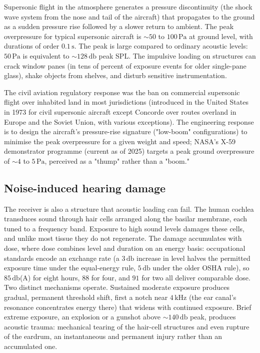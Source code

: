 Supersonic flight in the atmosphere generates a pressure
discontinuity (the shock wave system from the nose and tail of the
aircraft) that propagates to the ground as a sudden pressure rise
followed by a slower return to ambient. The peak overpressure for
typical supersonic aircraft is $\sim 50$ to $100\,\si{\pascal}$ at
ground level, with durations of order $0.1\,\si{\second}$. The peak
is large compared to ordinary acoustic levels: $50\,\si{\pascal}$ is
equivalent to $\sim 128\,\si{\decibel}$ peak SPL. The impulsive
loading on structures can crack window panes (in tens of percent of
exposure events for older single-pane glass), shake objects from
shelves, and disturb sensitive instrumentation.

The civil aviation regulatory response was the ban on commercial
supersonic flight over inhabited land in most jurisdictions
(introduced in the United States in 1973 for civil supersonic
aircraft except Concorde over routes overland in Europe and the
Soviet Union, with various exceptions). The engineering response is
to design the aircraft's pressure-rise signature ("low-boom"
configurations) to minimise the peak overpressure for a given
weight and speed; NASA's X-59 demonstrator programme (current as of
2025) targets a peak ground overpressure of $\sim 4$ to $5\,\si{
\pascal}$, perceived as a "thump" rather than a "boom."

\subsection{Noise-induced hearing damage}

The receiver is also a structure that acoustic loading can fail. The
human cochlea transduces sound through hair cells arranged along the
basilar membrane, each tuned to a frequency band. Exposure to high
sound levels damages these cells, and unlike most tissue they do not
regenerate. The damage accumulates with dose, where dose combines level
and duration on an energy basis: occupational standards encode an
exchange rate (a $3\,\si{\decibel}$ increase in level halves the
permitted exposure time under the equal-energy rule, $5\,\si{\decibel}$
under the older OSHA rule), so $85\,\si{\decibel}$(A) for eight hours,
$88$ for four, and $91$ for two all deliver comparable dose. Two
distinct mechanisms operate. Sustained moderate exposure produces
gradual, permanent threshold shift, first a notch near
$4\,\si{\kilo\hertz}$ (the ear canal's resonance concentrates energy
there) that widens with continued exposure. Brief extreme exposure,
an explosion or a gunshot above $\sim 140\,\si{\decibel}$ peak,
produces acoustic trauma: mechanical tearing of the hair-cell
structures and even rupture of the eardrum, an instantaneous and
permanent injury rather than an accumulated one.

